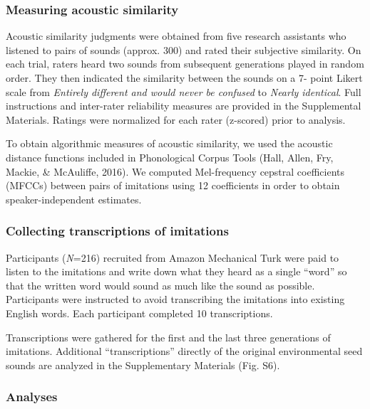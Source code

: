 \documentclass[english,floatsintext,man]{apa6}
\theoremstyle{definition}
\theoremstyle{definition}
\theoremstyle{definition}
\theoremstyle{remark}
\begin{document}
\hypertarget{measuring-acoustic-similarity}{%
\subsubsection{Measuring acoustic
similarity}\label{measuring-acoustic-similarity}}

Acoustic similarity judgments were obtained from five research
assistants who listened to pairs of sounds (approx. 300) and rated their
subjective similarity. On each trial, raters heard two sounds from
subsequent generations played in random order. They then indicated the
similarity between the sounds on a 7- point Likert scale from
\emph{Entirely different and would never be confused} to \emph{Nearly
identical}. Full instructions and inter-rater reliability measures are
provided in the Supplemental Materials. Ratings were normalized for each
rater (z-scored) prior to analysis.

To obtain algorithmic measures of acoustic similarity, we used the
acoustic distance functions included in Phonological Corpus Tools (Hall,
Allen, Fry, Mackie, \& McAuliffe, 2016). We computed Mel-frequency
cepstral coefficients (MFCCs) between pairs of imitations using 12
coefficients in order to obtain speaker-independent estimates.

\hypertarget{collecting-transcriptions-of-imitations}{%
\subsubsection{Collecting transcriptions of
imitations}\label{collecting-transcriptions-of-imitations}}

Participants (\emph{N}=216) recruited from Amazon Mechanical Turk were
paid to listen to the imitations and write down what they heard as a
single \enquote{word} so that the written word would sound as much like
the sound as possible. Participants were instructed to avoid
transcribing the imitations into existing English words. Each
participant completed 10 transcriptions.

Transcriptions were gathered for the first and the last three
generations of imitations. Additional \enquote{transcriptions} directly
of the original environmental seed sounds are analyzed in the
Supplementary Materials (Fig. S6).

\hypertarget{analyses}{%
\subsubsection{Analyses}\label{analyses}}
\end{document}
